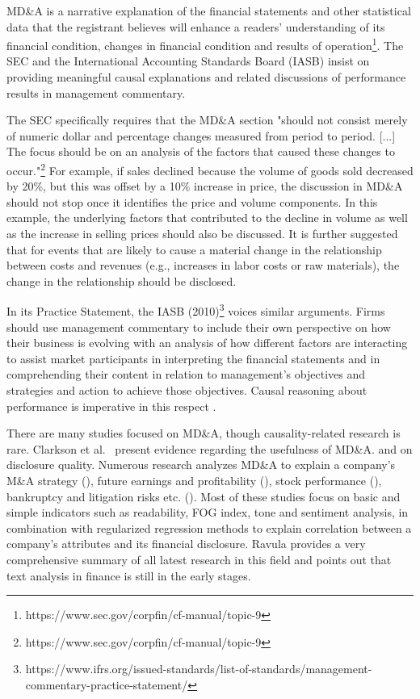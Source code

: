 MD\&A is a narrative explanation of the financial statements and other statistical data that the registrant believes will enhance a readers' understanding of its financial condition, changes in financial condition and results of operation\footnote{https://www.sec.gov/corpfin/cf-manual/topic-9}. The SEC and the International Accounting Standards Board (IASB) insist on providing meaningful causal explanations and related discussions of performance results in management commentary.

The SEC specifically requires that the MD\&A section "should not consist merely of numeric dollar and percentage changes measured from period to period. [...] The focus should be on an analysis of the factors that caused these changes to occur."\footnote {https://www.sec.gov/corpfin/cf-manual/topic-9} For example, if sales declined because the volume of goods sold decreased by 20\%, but this was offset by a 10\% increase in price, the discussion in MD\&A should not stop once it identifies the price and volume components. In this example, the underlying factors that contributed to the decline in volume as well as the increase in selling prices should also be discussed. It is further suggested that for events that are likely to cause a material change in the relationship between costs and revenues (e.g., increases in labor costs or raw materials), the change in the relationship should be disclosed.
 
In its Practice Statement, the IASB (2010)\footnote {https://www.ifrs.org/issued-standards/list-of-standards/management-commentary-practice-statement/} voices similar arguments. Firms should use management commentary to include their own perspective on how their business is evolving with an analysis of how different factors are interacting to assist market participants in interpreting the financial statements and in comprehending their content in relation to management's objectives and strategies and action to achieve those objectives. Causal reasoning about performance is imperative in this respect \cite{Zhang2018}.

There are many studies focused on MD\&A, though causality-related research is rare. Clarkson et al.~\cite{clarkson1998} present evidence regarding the usefulness of MD\&A. and on disclosure quality. Numerous research analyzes MD\&A to explain a company's M\&A strategy (\cite{Ahmed2016}), future earnings and profitability (\cite{Feldman2010, Bochkay2014, AmelZadeh2016}), stock performance (\cite{AmelZadeh2016, TaoDeokar2018}), bankruptcy and litigation risks etc. (\cite{YangDollarMo18, BourveauLouWang18}). Most of these studies focus on basic and simple indicators such as readability, FOG index, tone and sentiment analysis, in combination with regularized regression methods to explain correlation between a company's attributes and its financial disclosure. Ravula \cite{Ravula2020} provides a very comprehensive summary of all latest research in this field and points out that text analysis in finance is still in the early stages.

